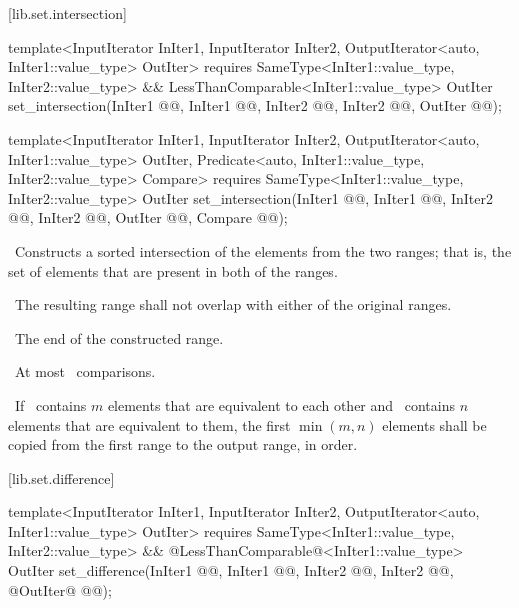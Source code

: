 \documentclass[american,twoside]{book}
\begin{document}
\begin{paras}
[lib.set.intersection]{}

%
\color{addclr}\begin{itemdecl}
template<InputIterator InIter1, InputIterator InIter2,
         OutputIterator<auto, InIter1::value_type> OutIter>
  requires SameType<InIter1::value_type, InIter2::value_type> &&
        LessThanComparable<InIter1::value_type>
  OutIter set_intersection(InIter1 @@, InIter1 @@,
                           InIter2 @@, InIter2 @@,
                           OutIter @@);

template<InputIterator InIter1, InputIterator InIter2,
         OutputIterator<auto, InIter1::value_type> OutIter, 
         Predicate<auto, InIter1::value_type, InIter2::value_type> Compare>
  requires SameType<InIter1::value_type, InIter2::value_type>
  OutIter set_intersection(InIter1 @@, InIter1 @@,
                           InIter2 @@, InIter2 @@,
                           OutIter @@, Compare @@);
\end{itemdecl}\color{black}

\begin{itemdescr}
\pnum
\effects\ 
Constructs a sorted intersection of the elements from the two ranges;
that is, the set of elements that are present in both of the ranges.

\pnum
\requires\ 
The resulting range shall not overlap with either of the original ranges.

\pnum
\returns\ 
The end of the constructed range.

\pnum
\complexity\ 
At most
\
comparisons.

\pnum
\notes\ If \ contains $m$ elements that are equivalent to
each other and \range{first2}{last2}\ contains $n$ elements that are equivalent
to them, the first $\min(m, n)$ elements shall be copied from the first range
to the output range, in order.
\end{itemdescr}

\rSec3[lib.set.difference]{\tcode{set_difference}}

%
\color{addclr}\begin{itemdecl}
template<InputIterator InIter1, InputIterator InIter2,
         OutputIterator<auto, InIter1::value_type> OutIter>
  requires SameType<InIter1::value_type, InIter2::value_type> &&
           @\textcolor{addclr}{LessThanComparable}@<InIter1::value_type>
  OutIter set_difference(InIter1 @@, InIter1 @@,
                         InIter2 @\farg{first2}@, InIter2 @@,
                         @\textcolor{addclr}{OutIter}@ @@);


\end{itemdecl}
\end{paras}
\end{document}
